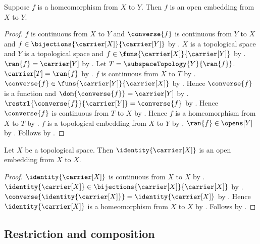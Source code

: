 \begin{theorem}\label{homeomorphism_is_open_embedding}
    Suppose $f$ is a homeomorphism from $X$ to $Y$.
    Then $f$ is an open embedding from $X$ to $Y$.
\end{theorem}
\begin{proof}
    $f$ is continuous from $X$ to $Y$ and
        $\converse{f}$ is continuous from $Y$ to $X$ and
        $f\in\bijections{\carrier[X]}{\carrier[Y]}$ by
        .
    $X$ is a topological space and $Y$ is a topological space and
        $f\in\funs{\carrier[X]}{\carrier[Y]}$ by .
    $\ran{f}=\carrier[Y]$ by .
    Let $T=\subspaceTopology{Y}{\ran{f}}$.
    $\carrier[T]=\ran{f}$ by
        .
    $f$ is continuous from $X$ to $T$ by
        .
    $\converse{f}\in\funs{\carrier[Y]}{\carrier[X]}$ by
        .
    Hence $\converse{f}$ is a function and
        $\dom{\converse{f}}=\carrier[Y]$ by .
    $\restrl{\converse{f}}{\carrier[Y]}=\converse{f}$ by
        .
    Hence $\converse{f}$ is continuous from $T$ to $X$ by
        .
    Hence $f$ is a homeomorphism from $X$ to $T$ by .
    $f$ is a topological embedding from $X$ to $Y$ by
        .
    $\ran{f}\in\opens[Y]$ by .
    Follows by .
\end{proof}

\begin{theorem}\label{identity_is_open_embedding}
    Let $X$ be a topological space.
    Then $\identity{\carrier[X]}$ is an open embedding from $X$ to $X$.
\end{theorem}
\begin{proof}
    $\identity{\carrier[X]}$ is continuous from $X$ to $X$ by
        .
    $\identity{\carrier[X]}\in\bijections{\carrier[X]}{\carrier[X]}$
        by .
    $\converse{\identity{\carrier[X]}}=\identity{\carrier[X]}$ by
        .
    Hence $\identity{\carrier[X]}$ is a homeomorphism from $X$ to $X$
        by .
    Follows by .
\end{proof}

\subsection{Restriction and composition}

